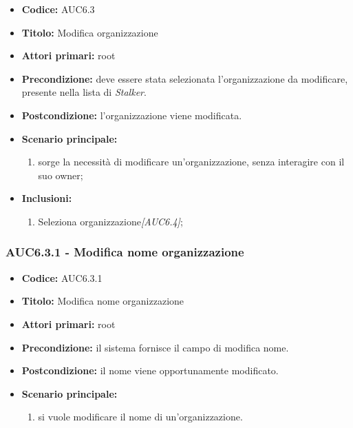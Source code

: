 \documentclass[casi-duso]{subfiles}
\begin{document}
\begin{itemize}
  \item \textbf{Codice:} AUC6.3
  \item \textbf{Titolo:} Modifica organizzazione
  \item \textbf{Attori primari:} root
  \item \textbf{Precondizione:} deve essere stata selezionata l'organizzazione da modificare, presente nella lista di \emph{Stalker}.
  \item \textbf{Postcondizione:} l'organizzazione viene modificata.
  \item \textbf{Scenario principale:}
  \begin{enumerate}
    \item sorge la necessità di modificare un'organizzazione, senza interagire con il suo owner;
  \end{enumerate}
  \item \textbf{Inclusioni:}
  \begin{enumerate}
    \item Seleziona organizzazione\emph{[AUC6.4]};
  \end{enumerate}
\end{itemize}

\subsubsection{AUC6.3.1 - Modifica nome organizzazione}%
\label{subsub:AUC6.3.1}
\begin{itemize}
  \item \textbf{Codice:} AUC6.3.1
  \item \textbf{Titolo:} Modifica nome organizzazione
  \item \textbf{Attori primari:} root
  \item \textbf{Precondizione:} il sistema fornisce il campo di modifica nome.
  \item \textbf{Postcondizione:} il nome viene opportunamente modificato.
  \item \textbf{Scenario principale:}
  \begin{enumerate}
    \item si vuole modificare il nome di un'organizzazione.
  \end{enumerate}
\end{itemize}
\end{document}
